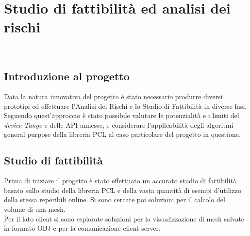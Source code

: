 
\chapter{Studio di fattibilità ed analisi dei rischi}
\label{cap:descrizione-stage}

\\

\section{Introduzione al progetto}

Data la natura innovativa del progetto è stato necessario produrre diversi prototipi ed
effettuare l’Analisi dei Rischi e lo Studio di Fattibilità in diverse fasi.
Seguendo quest'approccio è stato possibile valutare le potenzialità e i limiti del \emph{device Tango} e delle API annesse, e considerare l'applicabilità degli algoritmi general purpose della libreria PCL al caso particolare del progetto in questione.

\section{Studio di fattibilità}
Prima di iniziare il progetto è stato effettuato un accurato studio di fattibilità basato sullo studio della libreria PCL e della vasta quantità di esempi d'utilizzo della stessa reperibili online. Si sono cercate poi soluzioni per il calcolo del volume di una mesh.\\
Per il lato client si sono esplorate soluzioni per la visualizzazione di mesh salvate in formato OBJ e per la comunicazione client-server.


